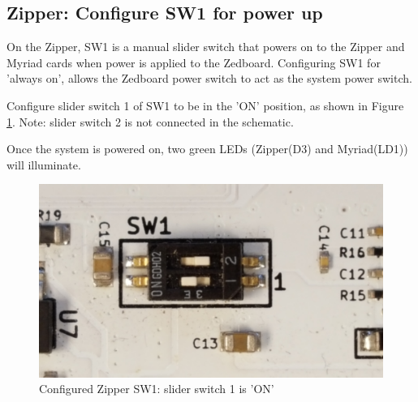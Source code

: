 \documentclass{article}
\begin{document}
\subsection*{Zipper: Configure SW1 for power up}
On the Zipper, SW1 is a manual slider switch that powers on to the Zipper and Myriad cards when power is applied to the Zedboard.  Configuring SW1 for 'always on', allows the Zedboard power switch to act as the system power switch.\par\medskip
\noindent Configure slider switch 1 of SW1 to be in the 'ON' position, as shown in Figure \ref{fig:zipper_sw1_configured}. Note: slider switch 2 is not connected in the schematic.\par\medskip
\noindent Once the system is powered on, two green LEDs (Zipper(D3) and Myriad(LD1)) will illuminate.\par\smallskip
	\begin{figure}[ht]
		\begin{center}
		\includegraphics[scale=0.05]{zipper_sw1_configured}
		\caption{Configured Zipper SW1: slider switch 1 is 'ON'}
		\label{fig:zipper_sw1_configured}
		\end{center}
	\end{figure}
\pagebreak

\normalsize
\end{document}
